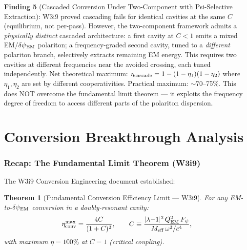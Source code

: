 \documentclass[11pt]{article}
\newtheorem{theorem}{Theorem}
\newcommand{\dpsiEM}{\delta\psi_{\rm EM}}
\newcommand{\Meff}{M_{\rm eff}}
\newcommand{\lambdaone}{|\lambda{-}1|}
\newcommand{\QEM}{Q_{\rm EM}}
\newcommand{\Fpsi}{F_\psi}
\begin{document}
\begin{tcolorbox}[colback=blue!5!white, colframe=blue!60!black,
  title=\textbf{W4i10 P4: Five Key Findings}]
\textbf{Finding 5} (Cascaded Conversion Under Two-Component with
Psi-Selective Extraction):
W3i9 proved cascading fails for identical cavities at the same $C$
(equilibrium, not per-pass). However, the two-component framework
admits a \emph{physically distinct} cascaded architecture: a first
cavity at $C < 1$ emits a mixed EM/$\dpsiEM$ polariton; a frequency-graded
second cavity, tuned to a \emph{different} polariton branch, selectively
extracts remaining EM energy. This requires two cavities at different
frequencies near the avoided crossing, each tuned independently.
Net theoretical maximum: $\eta_{\rm cascade} = 1 - (1-\eta_1)(1-\eta_2)$
where $\eta_1, \eta_2$ are set by different cooperativities. Practical
maximum: $\sim$70--75\%. This does NOT overcome the fundamental limit
theorem --- it exploits the frequency degree of freedom to access
different parts of the polariton dispersion.
\end{tcolorbox}

\part{Conversion Breakthrough Analysis}
\label{part:conversion}

\section{Recap: The Fundamental Limit Theorem (W3i9)}
\label{sec:recap}

The W3i9 Conversion Engineering document established:

\begin{theorem}[Fundamental Conversion Efficiency Limit --- W3i9]
\label{thm:fundamental-recap}
For any EM-to-$\dpsiEM$ conversion in a doubly-resonant cavity:
\begin{equation}
\eta_{\rm conv}^{\rm max} = \frac{4C}{(1+C)^2},
\qquad C \equiv \frac{\lambdaone^2\,\QEM^2\,\Fpsi}{\Meff\,\omega^2/c^4},
\label{eq:fundamental-limit}
\end{equation}
with maximum $\eta = 100\%$ at $C = 1$ (critical coupling).
\end{theorem}
\end{document}
